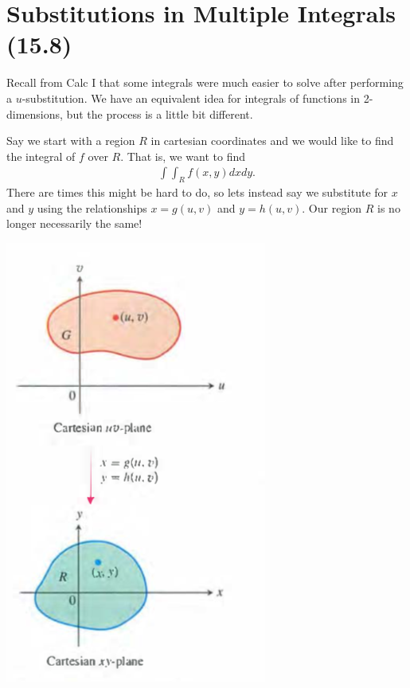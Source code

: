 \documentclass[12pt, letter]{article}
\theoremstyle{plain}
\numberwithin{theorem}{section}
\theoremstyle{definition}
\begin{document}
\bigskip

\hrulefill

\bigskip


\newpage


\section{Substitutions in Multiple Integrals (15.8)}

Recall from Calc I that some integrals were much easier to solve after performing a $u$-substitution. We have an equivalent idea for integrals of functions in 2-dimensions, but the process is a little bit different.

\bigskip

Say we start with a region $R$ in cartesian coordinates and we would like to find the integral of $f$ over $R$. That is, we want to find
\begin{align*}
\int\int_R f(x,y)dxdy.
\end{align*}
There are times this might be hard to do, so lets instead say we substitute for $x$ and $y$ using the relationships $x=g(u,v)$ and $y=h(u,v)$. Our region $R$ is no longer necessarily the same!

\bigskip

\begin{center}
\includegraphics[scale=0.7]{m3_f23}
\end{center}
\end{document}
